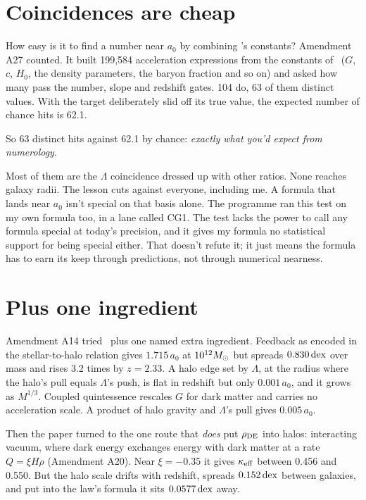 \section{Coincidences are cheap}

How easy is it to find a number near $a_0$ by combining \LCDM's constants? Amendment A27 counted. It built 199,584 acceleration expressions from the constants of \LCDM\ ($G$, $c$, $H_0$, the density parameters, the baryon fraction and so on) and asked how many pass the number, slope and redshift gates. 104 do, 63 of them distinct values. With the target deliberately slid off its true value, the expected number of chance hits is 62.1.

So 63 distinct hits against 62.1 by chance: \emph{exactly what you'd expect from numerology}.

 Most of them are the $\Lambda$ coincidence dressed up with other ratios. None reaches galaxy radii. The lesson cuts against everyone, including me. A formula that lands near $a_0$ isn't special on that basis alone. The programme ran this test on my own formula too, in a lane called CG1. The test lacks the power to call any formula special at today's precision, and it gives my formula no statistical support for being special either. That doesn't refute it; it just means the formula has to earn its keep through predictions, not through numerical nearness.

\section{Plus one ingredient}

Amendment A14 tried \LCDM\ plus one named extra ingredient. Feedback as encoded in the stellar-to-halo relation gives $1.715\,a_0$ at $10^{12}M_\odot$ but spreads $0.830\,\mathrm{dex}$ over mass and rises 3.2 times by $z=2.33$. A halo edge set by $\Lambda$, at the radius where the halo's pull equals $\Lambda$'s push, is flat in redshift but only $0.001\,a_0$, and it grows as $M^{1/3}$. Coupled quintessence rescales $G$ for dark matter and carries no acceleration scale. A product of halo gravity and $\Lambda$'s pull gives $0.005\,a_0$.

Then the paper turned to the one route that \emph{does} put $\rho_{\rm DE}$ into halos: interacting vacuum, where dark energy exchanges energy with dark matter at a rate $Q=\xi H\rho$ (Amendment A20). Near $\xi=-0.35$ it gives $\kappa_{\rm eff}$ between 0.456 and 0.550. But the halo scale drifts with redshift, spreads $0.152\,\mathrm{dex}$ between galaxies, and put into the law's formula it sits $0.0577\,\mathrm{dex}$ away.

